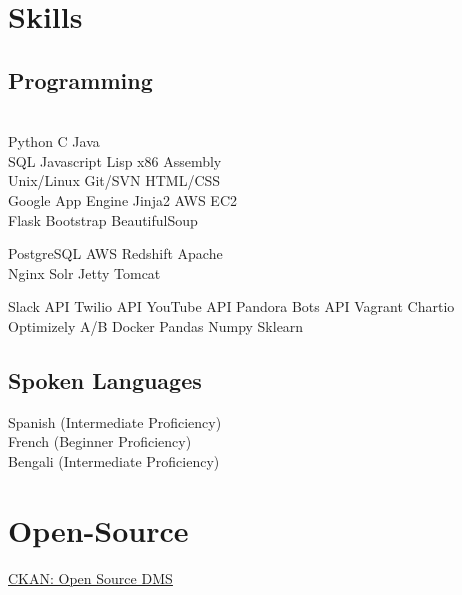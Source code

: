 \documentclass[]{deedy-resume-openfont}
\begin{document}
\begin{minipage}[t]{0.31\textwidth}

\section{Skills}
\subsection{Programming}
\\[1\baselineskip]

Python \textbullet{}     C     \textbullet{} Java  
\\[1\baselineskip]

SQL \textbullet{} Javascript \textbullet{} Lisp \textbullet{} x86 Assembly
\\[1\baselineskip]

Unix/Linux \textbullet{} Git/SVN \textbullet{} HTML/CSS \\
Google App Engine \textbullet{}  Jinja2  \textbullet{} AWS EC2\\
Flask \textbullet{} Bootstrap \textbullet{} BeautifulSoup  
\sectionsep

PostgreSQL \textbullet{} AWS Redshift \textbullet{} Apache \\ 
Nginx \textbullet{} Solr \textbullet{} Jetty \textbullet{} Tomcat
\sectionsep

  Slack API \textbullet{} Twilio API \textbullet{} YouTube API 
  Pandora Bots API \textbullet{}  Vagrant \textbullet{} Chartio 
  Optimizely A/B \textbullet{} Docker \textbullet{} Pandas 
  Numpy \textbullet{} Sklearn
\sectionsep

\subsection{Spoken Languages}
Spanish (Intermediate Proficiency) \\
French (Beginner Proficiency)\\
Bengali (Intermediate Proficiency)
\\[1\baselineskip]

\section{Open-Source}
\textbullet{} \color{cyan}\underline{\color{cyan}\href{https://github.com/ckan/ckan}{\color{cyan}CKAN: Open Source DMS}}

%
%

\end{minipage} 
\end{document}
